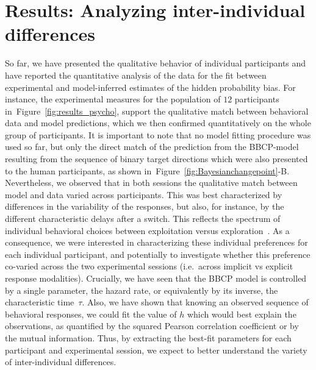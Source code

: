 \documentclass[10pt,letterpaper]{article}
\newcommand{\citep}[1]{\cite{#1}}
\newcommand{\seeFig}[1]{Figure~\ref{fig:#1}}
\begin{document}
\section{Results: Analyzing inter-individual differences}
\label{sec:inter}
So far, we have presented the qualitative behavior of individual participants and
have reported the quantitative analysis of the data
for the fit between experimental and model-inferred estimates of the hidden probability bias.
For instance, the experimental measures for the population of $12$ participants in~\seeFig{results_psycho},
support the qualitative match between behavioral data and model predictions,
which we then confirmed quantitatively on the whole group of participants.
It is important to note that no model fitting procedure was used so far,
but only the direct match of the prediction from the BBCP-model
resulting from the sequence of binary target directions
which were also presented to the human participants,
as shown in~\seeFig{Bayesianchangepoint}-B.
Nevertheless, we observed that in both sessions the qualitative match between model and data varied across participants.
This was best characterized by differences
in the variability of the responses, but also, for instance,
by the different characteristic delays after a switch.
This reflects the spectrum of individual behavioral choices
between exploitation versus exploration~\citep{Behrens07}.
As a consequence, we were interested in characterizing these individual preferences
for each individual participant,
and potentially to investigate whether this preference co-varied
across the two experimental sessions (i.e.~across implicit vs explicit response modalities).
Crucially, we have seen that the BBCP model is controlled by a single parameter,
the hazard rate, or equivalently by its inverse, the characteristic time~$\tau$.
Also, we have shown that knowing an observed sequence of behavioral responses,
we could fit the value of $h$ which would best explain the observations,
as quantified by the squared Pearson correlation coefficient or by the mutual information.
Thus, by extracting the best-fit parameters for each participant and experimental session,
we expect to better understand the variety of inter-individual differences. %
\end{document}
